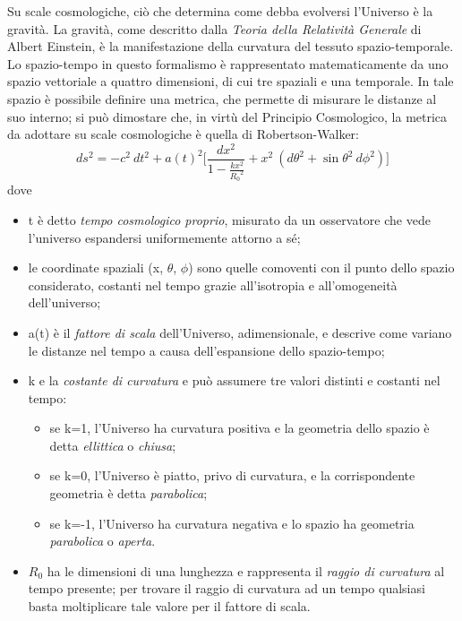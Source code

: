 Su scale cosmologiche, ciò che determina come debba evolversi l'Universo è la gravità.
La gravità, come descritto dalla \emph{Teoria della Relatività Generale} di Albert Einstein, è la manifestazione della curvatura del tessuto spazio-temporale.
Lo spazio-tempo in questo formalismo è rappresentato matematicamente da uno spazio vettoriale a quattro dimensioni, di cui tre spaziali e una temporale. In tale spazio è possibile definire una metrica, che permette di misurare le distanze al suo interno; si può dimostare che, in virtù del Principio Cosmologico, la metrica da adottare su scale cosmologiche è quella di Robertson-Walker:
\begin{equation}
    ds^2=-c^2\ dt^2+ a(t)^2\Bigg[\frac{dx^2}{1-\frac{kx^2}{{R_0}^2}}+x^2\ (d\theta^2+\sin\theta^2 \ d\phi^2)\Bigg]
\end{equation}
dove
\begin{itemize}
    \item t è detto \emph{tempo cosmologico proprio}, misurato da un osservatore che vede l'universo espandersi uniformemente attorno a sé;
    \item le coordinate spaziali (x, $\theta$, $\phi$) sono quelle comoventi con il punto dello spazio considerato, costanti nel tempo grazie all'isotropia e all'omogeneità dell'universo;
    \item a(t) è il \emph{fattore di scala} dell'Universo, adimensionale, e descrive come variano le distanze nel tempo a causa dell'espansione dello spazio-tempo;
    \item k e la \emph{costante di curvatura} e può assumere tre valori distinti e costanti nel tempo:
          \begin{itemize}
              \item se k=1, l'Universo ha curvatura positiva e la geometria dello spazio è detta \emph{ellittica} o \emph{chiusa};
              \item se k=0, l'Universo è piatto, privo di curvatura, e la corrispondente geometria è detta \emph{parabolica};
              \item se k=-1, l'Universo ha curvatura negativa e lo spazio ha geometria \emph{parabolica} o \emph{aperta}.
          \end{itemize}

    \item $R_0$ ha le dimensioni di una lunghezza e rappresenta il \emph{raggio di curvatura} al tempo presente; per trovare il raggio di curvatura ad un tempo qualsiasi basta moltiplicare tale valore per il fattore di scala.

\end{itemize}
